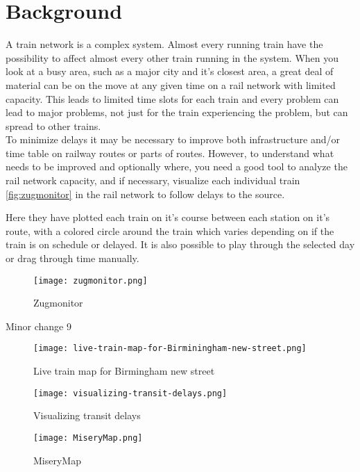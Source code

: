 
\chapter{Background}



A train network is a complex system. Almost every running train have the 
possibility to affect almost every other train running in the system.  When you look at a busy area, such as a major city and it's closest
area, a great deal of material can be on the move at any given time on a
rail network with limited capacity. This leads to limited time slots for each train and every
problem can lead to major problems, not just for the train experiencing the
problem, but can spread to other trains. \\

To minimize delays it may be necessary to improve both infrastructure and/or
time table on railway routes or parts of routes. However, to understand what
needs to be improved and optionally where, you need a good tool to analyze the
rail network capacity, and if necessary, visualize each individual train \vref{fig:zugmonitor} in the rail network to follow delays to the source.

Here they have plotted each train on it's course between each station on it's
route, with a colored circle around the train which varies depending on if the
train is on schedule or delayed. It is also possible to play through the
selected day or drag through time manually.

\begin{figure}[!htbp]
	\texttt{[image: zugmonitor.png]}
	\caption[Zugmonitor]{Zugmonitor \cite{zugmonitor}}
	\label{fig:zugmonitor}
\end{figure}

Minor change 9

\begin{figure}[!htbp]
	\texttt{[image: live-train-map-for-Birminingham-new-street.png]}
	\caption[Live train map for Birmingham new street]{Live train map for Birmingham new street \cite{birminghamLiveMap}}
	\label{fig:birminghamLiveMap}
\end{figure}

\begin{figure}[!htbp]
	\texttt{[image: visualizing-transit-delays.png]}
	\caption[Visualizing transit delays]{Visualizing transit delays \cite{muniLightRail}}
	\label{fig:muniLightRail}
\end{figure}

\begin{figure}[!htbp]
	\texttt{[image: MiseryMap.png]}
	\caption[MiseryMap]{MiseryMap \cite{flightAware:MiseryMap}}
	\label{fig:miserymap}
\end{figure}
 
